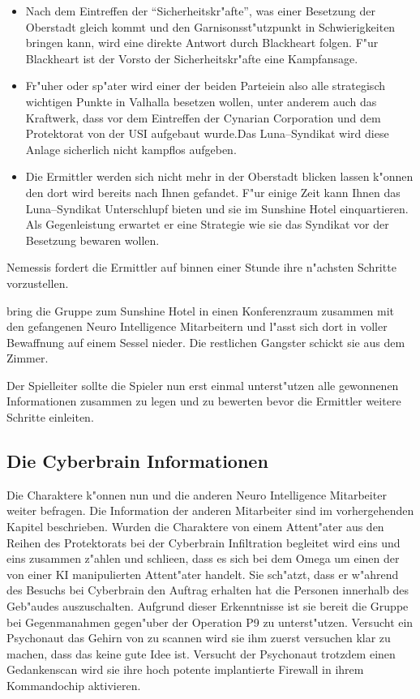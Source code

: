 \begin{itemize}
	\item Nach dem Eintreffen der "`Sicherheitskr"afte"', was einer Besetzung der Oberstadt gleich kommt und den 			
		Garnisonsst"utzpunkt in Schwierigkeiten bringen kann, wird eine direkte Antwort durch Blackheart folgen. F"ur Blackheart ist der Vorsto\3 der Sicherheitskr"afte eine Kampfansage.
	\item Fr"uher oder sp"ater wird einer der beiden Parteiein also alle strategisch wichtigen Punkte in Valhalla besetzen wollen, unter 	
		anderem auch das Kraftwerk, dass vor dem Eintreffen der Cynarian Corporation und dem Protektorat von der USI aufgebaut wurde.Das Luna--Syndikat wird diese Anlage sicherlich nicht kampflos aufgeben.
		\item Die Ermittler werden sich nicht mehr in der Oberstadt blicken lassen k"onnen den dort wird bereits nach Ihnen gefandet. F"ur 
		einige Zeit kann Ihnen das Luna--Syndikat Unterschlupf bieten und sie im Sunshine Hotel einquartieren. Als Gegenleistung erwartet er eine Strategie wie sie das Syndikat vor der Besetzung bewaren wollen.			
\end{itemize}

Nemessis fordert die Ermittler auf binnen einer Stunde ihre n"achsten Schritte vorzustellen. 


\xl{} bring die Gruppe zum Sunshine Hotel in einen Konferenzraum zusammen mit den gefangenen Neuro Intelligence Mitarbeitern und l"asst sich dort in voller Bewaffnung auf einem Sessel nieder. Die restlichen Gangster schickt sie aus dem Zimmer.

Der Spielleiter sollte die Spieler nun erst einmal unterst"utzen alle gewonnenen Informationen zusammen zu legen und zu bewerten bevor die Ermittler weitere Schritte einleiten. 

\subsection{Die Cyberbrain Informationen} 
Die Charaktere k"onnen nun \ml{} und die anderen Neuro Intelligence Mitarbeiter weiter befragen. Die Information der anderen Mitarbeiter sind im vorhergehenden Kapitel beschrieben. Wurden die Charaktere von einem Attent"ater aus den Reihen des Protektorats bei der Cyberbrain Infiltration begleitet wird \ml{} eins und eins zusammen z"ahlen und schlie\3en, dass es sich bei dem Omega um einen der von einer KI manipulierten Attent"ater handelt. Sie sch"atzt, dass er w"ahrend des Besuchs bei Cyberbrain den Auftrag erhalten hat die Personen innerhalb des Geb"audes auszuschalten. Aufgrund dieser Erkenntnisse ist sie bereit die Gruppe bei Gegenma\3nahmen gegen"uber der Operation P9 zu unterst"utzen. Versucht ein Psychonaut das Gehirn von \ml{} zu scannen wird sie ihm zuerst versuchen klar zu machen, dass das keine gute Idee ist. Versucht der Psychonaut trotzdem einen Gedankenscan wird sie ihre hoch potente implantierte Firewall in ihrem Kommandochip aktivieren.

